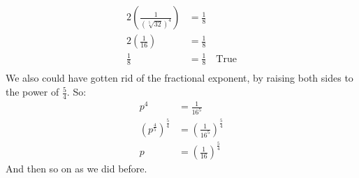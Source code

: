 \begin{enumerate}
\begin{align*}
        2\left(\frac{1}{(\sqrt[5]{32})^4}\right) &= \frac{1}{8} \\
        2\left(\frac{1}{16}\right) &= \frac{1}{8} \\
        \frac{1}{8} &= \frac{1}{8} \quad \text{True} \\
    \end{align*}
    We also could have gotten rid of the fractional exponent, by raising both sides to the power of $\frac{5}{4}$.
    So: 
    \begin{align*}
        p^4 &= \frac{1}{16^5} \\
        (p^{\frac{4}{5}})^{\frac{5}{4}} &= \left(\frac{1}{16^5}\right)^{\frac{5}{4}} \\
        p &= (\frac{1}{16})^{\frac{5}{4}} 
    \end{align*}
    And then so on as we did before.
\end{enumerate}